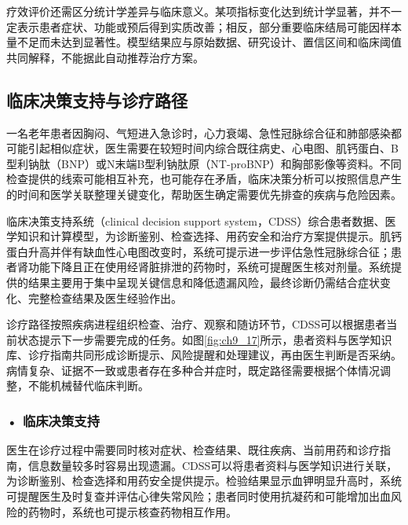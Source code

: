 疗效评价还需区分统计学差异与临床意义。某项指标变化达到统计学显著，并不一定表示患者症状、功能或预后得到实质改善；相反，部分重要临床结局可能因样本量不足而未达到显著性。模型结果应与原始数据、研究设计、置信区间和临床阈值共同解释，不能据此自动推荐治疗方案。

\subsection{临床决策支持与诊疗路径}


一名老年患者因胸闷、气短进入急诊时，心力衰竭、急性冠脉综合征和肺部感染都可能引起相似症状，医生需要在较短时间内综合既往病史、心电图、肌钙蛋白、B型利钠肽（BNP）或N末端B型利钠肽原（NT-proBNP）和胸部影像等资料。不同检查提供的线索可能相互补充，也可能存在矛盾，临床决策分析可以按照信息产生的时间和医学关联整理关键变化，帮助医生确定需要优先排查的疾病与危险因素。

临床决策支持系统（clinical decision support system，CDSS）综合患者数据、医学知识和计算模型，为诊断鉴别、检查选择、用药安全和治疗方案提供提示。肌钙蛋白升高并伴有缺血性心电图改变时，系统可提示进一步评估急性冠脉综合征；患者肾功能下降且正在使用经肾脏排泄的药物时，系统可提醒医生核对剂量。系统提供的结果主要用于集中呈现关键信息和降低遗漏风险，最终诊断仍需结合症状变化、完整检查结果及医生经验作出。

诊疗路径按照疾病进程组织检查、治疗、观察和随访环节，CDSS可以根据患者当前状态提示下一步需要完成的任务。如图\ref{fig:ch9_17}所示，患者资料与医学知识库、诊疗指南共同形成诊断提示、风险提醒和处理建议，再由医生判断是否采纳。病情复杂、证据不一致或患者存在多种合并症时，既定路径需要根据个体情况调整，不能机械替代临床判断。


\par
\noindent\begin{minipage}{\textwidth}
\centering
{}
\label{fig:ch9_17}
\end{minipage}
\par

\subsubsection*{\textbf{• 临床决策支持}}

医生在诊疗过程中需要同时核对症状、检查结果、既往疾病、当前用药和诊疗指南，信息数量较多时容易出现遗漏。CDSS可以将患者资料与医学知识进行关联，为诊断鉴别、检查选择和用药安全提供提示。检验结果显示血钾明显升高时，系统可提醒医生及时复查并评估心律失常风险；患者同时使用抗凝药和可能增加出血风险的药物时，系统也可提示核查药物相互作用。

